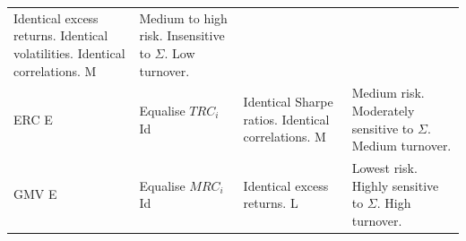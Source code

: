 \documentclass[
]{article}
\begin{document}
\begin{longtable}[]{@{}llll@{}}
\begin{minipage}[t]{0.39\columnwidth}
Identical excess returns. Identical volatilities. Identical correlations. \textbar{} M\strut
\end{minipage} & \begin{minipage}[t]{0.34\columnwidth}\raggedright
Medium to high risk. Insensitive to \(\Sigma\). Low turnover. \textbar{}\strut
\end{minipage}\tabularnewline
\begin{minipage}[t]{0.06\columnwidth}\raggedright
ERC \textbar{} E\strut
\end{minipage} & \begin{minipage}[t]{0.09\columnwidth}\raggedright
Equalise \(TRC_i\) \textbar{} Id\strut
\end{minipage} & \begin{minipage}[t]{0.39\columnwidth}\raggedright
Identical Sharpe ratios. Identical correlations. \textbar{} M\strut
\end{minipage} & \begin{minipage}[t]{0.34\columnwidth}\raggedright
Medium risk. Moderately sensitive to \(\Sigma\). Medium turnover. \textbar{}\strut
\end{minipage}\tabularnewline
\begin{minipage}[t]{0.06\columnwidth}\raggedright
GMV \textbar{} E\strut
\end{minipage} & \begin{minipage}[t]{0.09\columnwidth}\raggedright
Equalise \(MRC_i\) \textbar{} Id\strut
\end{minipage} & \begin{minipage}[t]{0.39\columnwidth}\raggedright
Identical excess returns. \textbar{} L\strut
\end{minipage} & \begin{minipage}[t]{0.34\columnwidth}\raggedright
Lowest risk. Highly sensitive to \(\Sigma\). High turnover. \textbar{}\strut
\end{minipage}\tabularnewline
\bottomrule
\end{longtable}
\end{document}
